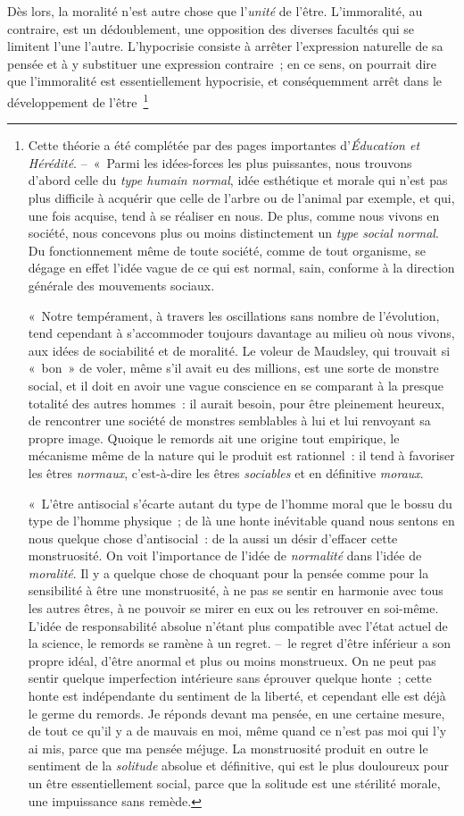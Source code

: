\documentclass[french,twoside]{book} %
\begin{document}
Dès lors, la moralité n’est autre chose que l’\emph{unité} de l’être. L’immoralité, au contraire, est un dédoublement, une opposition des diverses facultés qui se limitent l’une l’autre. L’hypocrisie consiste à arrêter l’expression naturelle de sa pensée et à y substituer une expression contraire ; en ce sens, on pourrait dire que l’immoralité est essentiellement hypocrisie, et conséquemment arrêt dans le développement de l’être \footnote{ \noindent Cette théorie a été complétée par des pages importantes d’\emph{Éducation et Hérédité}. – « Parmi les idées-forces les plus puissantes, nous trouvons d’abord celle du \emph{type humain normal}, idée esthétique et morale qui n’est pas plus difficile à acquérir que celle de l’arbre ou de l’animal par exemple, et qui, une fois acquise, tend à se réaliser en nous. De plus, comme nous vivons en société, nous concevons plus ou moins distinctement un \emph{type social normal}. Du fonctionnement même de toute société, comme de tout organisme, se dégage en effet l’idée vague de ce qui est normal, sain, conforme à la direction générale des mouvements sociaux.\par
 « Notre tempérament, à travers les oscillations sans nombre de l’évolution, tend cependant à s’accommoder toujours davantage au milieu où nous vivons, aux idées de sociabilité et de moralité. Le voleur de Maudsley, qui trouvait si « bon » de voler, même s’il avait eu des millions, est une sorte de monstre social, et il doit en avoir une vague conscience en se comparant à la presque totalité des autres hommes : il aurait besoin, pour être pleinement heureux, de rencontrer une société de monstres semblables à lui et lui renvoyant sa propre image. Quoique le remords ait une origine tout empirique, le mécanisme même de la nature qui le produit est rationnel : il tend à favoriser les êtres \emph{normaux}, c’est-à-dire les êtres \emph{sociables} et en définitive \emph{moraux}.\par
 « L’être antisocial s’écarte autant du type de l’homme moral que le bossu du type de l’homme physique ; de là une honte inévitable quand nous sentons en nous quelque chose d’antisocial : de la aussi un désir d’effacer cette monstruosité. On voit l’importance de l’idée de \emph{normalité} dans l’idée de \emph{moralité}. Il y a quelque chose de choquant pour la pensée comme pour la sensibilité à être une monstruosité, à ne pas se sentir en harmonie avec tous les autres êtres, à ne pouvoir se mirer en eux ou les retrouver en soi-même. L’idée de responsabilité absolue n’étant plus compatible avec l’état actuel de la science, le remords se ramène à un regret. – le regret d’être inférieur a son propre idéal, d’être anormal et plus ou moins monstrueux. On ne peut pas sentir quelque imperfection intérieure sans éprouver quelque honte ; cette honte est indépendante du sentiment de la liberté, et cependant elle est déjà le germe du remords. Je réponds devant ma pensée, en une certaine mesure, de tout ce qu’il y a de mauvais en moi, même quand ce n’est pas moi qui l’y ai mis, parce que ma pensée méjuge. La monstruosité produit en outre le sentiment de la \emph{solitude} absolue et définitive, qui est le plus douloureux pour un être essentiellement social, parce que la solitude est une stérilité morale, une impuissance sans remède.\par
}
\end{document}
